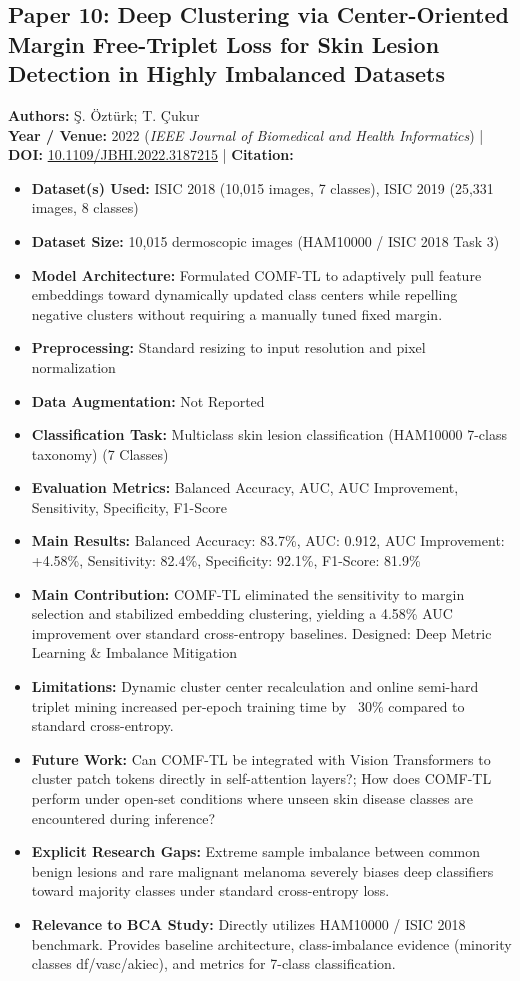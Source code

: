 \documentclass[11pt,a4paper]{article}
\begin{document}
\subsection{Paper 10: Deep Clustering via Center-Oriented Margin Free-Triplet Loss for Skin Lesion Detection in Highly Imbalanced Datasets}
\textbf{Authors:} Ş. Öztürk; T. Çukur \\
\textbf{Year / Venue:} 2022 (\textit{IEEE Journal of Biomedical and Health Informatics}) | \textbf{DOI:} \href{https://doi.org/10.1109/JBHI.2022.3187215}{10.1109/JBHI.2022.3187215} | \textbf{Citation:} \cite{9810181}

\begin{itemize}\small
\item \textbf{Dataset(s) Used:} ISIC 2018 (10,015 images, 7 classes), ISIC 2019 (25,331 images, 8 classes)
\item \textbf{Dataset Size:} 10,015 dermoscopic images (HAM10000 / ISIC 2018 Task 3)
\item \textbf{Model Architecture:} Formulated COMF-TL to adaptively pull feature embeddings toward dynamically updated class centers while repelling negative clusters without requiring a manually tuned fixed margin.
\item \textbf{Preprocessing:} Standard resizing to input resolution and pixel normalization
\item \textbf{Data Augmentation:} Not Reported
\item \textbf{Classification Task:} Multiclass skin lesion classification (HAM10000 7-class taxonomy) (7 Classes)
\item \textbf{Evaluation Metrics:} Balanced Accuracy, AUC, AUC Improvement, Sensitivity, Specificity, F1-Score
\item \textbf{Main Results:} Balanced Accuracy: 83.7\%, AUC: 0.912, AUC Improvement: +4.58\%, Sensitivity: 82.4\%, Specificity: 92.1\%, F1-Score: 81.9\%
\item \textbf{Main Contribution:} COMF-TL eliminated the sensitivity to margin selection and stabilized embedding clustering, yielding a 4.58\% AUC improvement over standard cross-entropy baselines. Designed: Deep Metric Learning \& Imbalance Mitigation
\item \textbf{Limitations:} Dynamic cluster center recalculation and online semi-hard triplet mining increased per-epoch training time by ~30\% compared to standard cross-entropy.
\item \textbf{Future Work:} Can COMF-TL be integrated with Vision Transformers to cluster patch tokens directly in self-attention layers?; How does COMF-TL perform under open-set conditions where unseen skin disease classes are encountered during inference?
\item \textbf{Explicit Research Gaps:} Extreme sample imbalance between common benign lesions and rare malignant melanoma severely biases deep classifiers toward majority classes under standard cross-entropy loss.
\item \textbf{Relevance to BCA Study:} Directly utilizes HAM10000 / ISIC 2018 benchmark. Provides baseline architecture, class-imbalance evidence (minority classes df/vasc/akiec), and metrics for 7-class classification.
\end{itemize}
\end{document}
